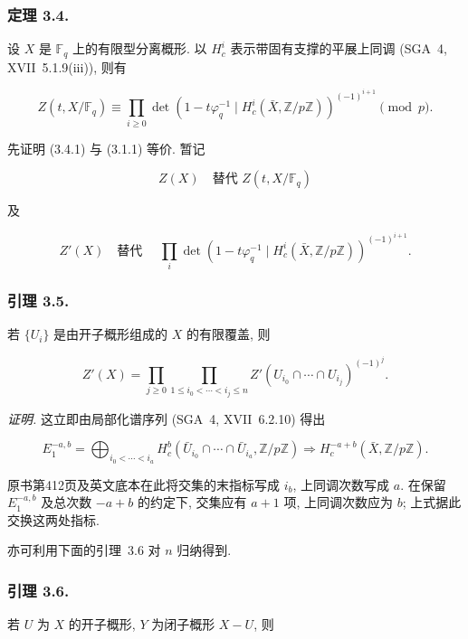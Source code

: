 \subsubsection*{定理 3.4.}
设 $X$ 是 $\mathbb F_q$ 上的有限型分离概形.
以 $H_c^i$ 表示带固有支撑的平展上同调 (SGA~4, XVII~5.1.9(iii)), 则有

\begin{equation}\tag{3.4.1}
Z(t,X/\mathbb F_q)
\equiv
\prod_{i\geq0}
\det\!\left(1-t\varphi_q^{-1}\mid
H_c^i(\bar X,\mathbb Z/p\mathbb Z)\right)^{(-1)^{i+1}}
\pmod p.
\end{equation}

先证明 (3.4.1) 与 (3.1.1) 等价. 暂记

\begin{equation}\tag{3.4.2}
Z(X)\quad\text{替代 }Z(t,X/\mathbb F_q)
\end{equation}

及

\begin{equation}\tag{3.4.3}
Z'(X)\quad\text{替代 }\quad
\prod_i\det\!\left(1-t\varphi_q^{-1}\mid
H_c^i(\bar X,\mathbb Z/p\mathbb Z)\right)^{(-1)^{i+1}}.
\end{equation}

\subsubsection*{引理 3.5.}
若 $\{U_i\}$ 是由开子概形组成的 $X$ 的有限覆盖, 则

\begin{equation}\tag{3.5.1}
Z'(X)=
\prod_{j\geq0}
\prod_{1\leq i_0<\cdots<i_j\leq n}
Z'(U_{i_0}\cap\cdots\cap U_{i_j})^{(-1)^j}.
\end{equation}

\medskip
\noindent\emph{证明.}
这立即由局部化谱序列 (SGA~4, XVII~6.2.10) 得出

\[
E_1^{-a,b}=\bigoplus_{i_0<\cdots<i_a}
H_c^b(\bar U_{i_0}\cap\cdots\cap\bar U_{i_a},\mathbb Z/p\mathbb Z)
\Longrightarrow H_c^{-a+b}(\bar X,\mathbb Z/p\mathbb Z).
\]

\begin{editorialnote}
原书第412页及英文底本在此将交集的末指标写成 $i_b$, 上同调次数写成 $a$.
在保留 $E_1^{-a,b}$ 及总次数 $-a+b$ 的约定下, 交集应有 $a+1$ 项, 上同调次数应为 $b$;
上式据此交换这两处指标.
\end{editorialnote}

亦可利用下面的引理~3.6 对 $n$ 归纳得到.

\subsubsection*{引理 3.6.}
若 $U$ 为 $X$ 的开子概形, $Y$ 为闭子概形 $X-U$, 则

